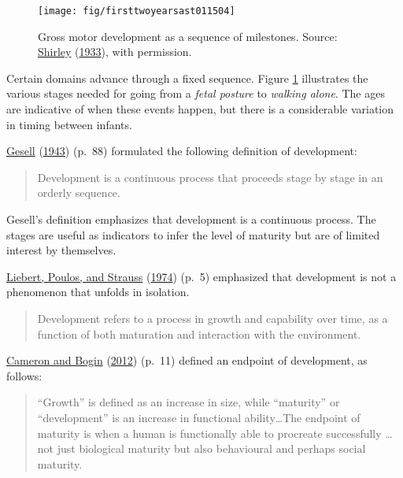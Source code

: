\documentclass[
]{book}
\begin{document}
\begin{figure}

{\centering \texttt{[image: fig/firsttwoyearsast011504]} 

}

\caption{Gross motor development as a sequence of milestones. Source: \protect\hyperlink{ref-shirley1933}{Shirley} (\protect\hyperlink{ref-shirley1933}{1933}), with permission.}\label{fig:shirleyplot}
\end{figure}



Certain domains advance through a fixed sequence. Figure \ref{fig:shirleyplot} illustrates the various stages needed for going from a \emph{fetal posture} to \emph{walking alone}. The ages are indicative of when these events happen, but there is a considerable variation in timing between infants.

\protect\hyperlink{ref-gesell1943}{Gesell} (\protect\hyperlink{ref-gesell1943}{1943}) (p.~88) formulated the following definition of development:

\begin{quote}
Development is a continuous process that proceeds stage by stage in an orderly sequence.
\end{quote}

Gesell's definition emphasizes that development is a continuous process. The stages are useful as indicators to infer the level of maturity but are of limited interest by themselves.

\protect\hyperlink{ref-liebert1974}{Liebert, Poulos, and Strauss} (\protect\hyperlink{ref-liebert1974}{1974}) (p.~5) emphasized that development is not a phenomenon that unfolds in isolation.

\begin{quote}
Development refers to a process in growth and capability over time, as a function of both maturation and interaction with the environment.
\end{quote}

\protect\hyperlink{ref-cameron2012}{Cameron and Bogin} (\protect\hyperlink{ref-cameron2012}{2012}) (p.~11) defined an endpoint of development, as follows:

\begin{quote}
``Growth'' is defined as an increase in size, while ``maturity'' or ``development'' is an increase in functional ability\ldots The endpoint of maturity is when a human is functionally able to procreate successfully \ldots{} not just biological maturity but also behavioural and perhaps social maturity.
\end{quote}
\end{document}
